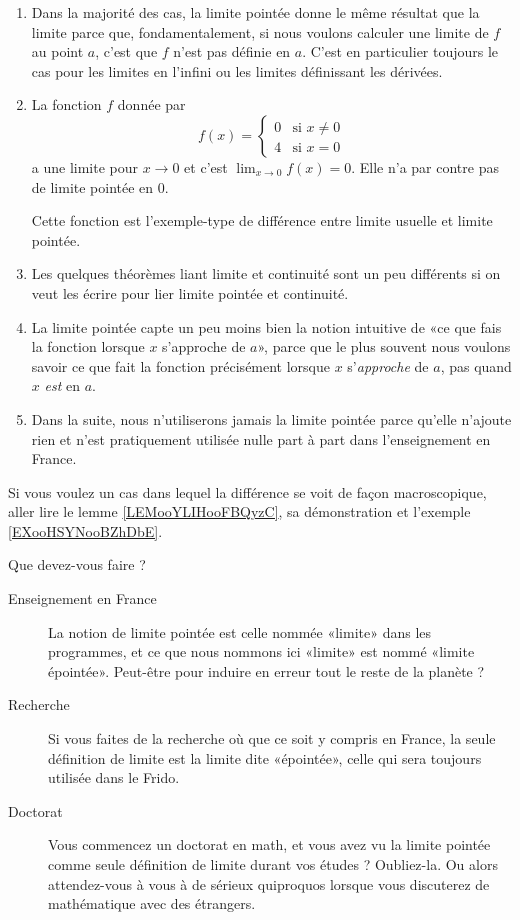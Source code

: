 \begin{enumerate}
    \item
        Dans la majorité des cas, la limite pointée donne le même résultat que la limite parce que, fondamentalement, si nous voulons calculer une limite de \( f\) au point \( a\), c'est que \( f\) n'est pas définie en \( a\). C'est en particulier toujours le cas pour les limites en l'infini ou les limites définissant les dérivées.
    \item
        La fonction \( f\) donnée par
        \begin{equation}
            f(x)=\begin{cases}
                0    &   \text{si } x\neq 0\\
                4    &    \text{si }x=0
            \end{cases}
        \end{equation}
        a une limite pour \( x\to 0\) et c'est \( \lim_{x\to 0} f(x)=0\). Elle n'a par contre pas de limite pointée en \( 0\).

        Cette fonction est l'exemple-type de différence entre limite usuelle et limite pointée.
    \item
        Les quelques théorèmes liant limite et continuité sont un peu différents si on veut les écrire pour lier limite pointée et continuité.
    \item
        La limite pointée capte un peu moins bien la notion intuitive de «ce que fais la fonction lorsque \( x\) s'approche de \( a\)», parce que le plus souvent nous voulons savoir ce que fait la fonction précisément lorsque \( x\) s'\emph{approche} de \( a\), pas quand \( x\) \emph{est} en \( a\).
    \item
        Dans la suite, nous n'utiliserons jamais la limite pointée parce qu'elle n'ajoute rien et n'est pratiquement utilisée nulle part à part dans l'enseignement en France.
\end{enumerate}

Si vous voulez un cas dans lequel la différence se voit de façon macroscopique, aller lire le lemme \ref{LEMooYLIHooFBQyzC}, sa démonstration et l'exemple \ref{EXooHSYNooBZhDbE}.

Que devez-vous faire ?
\begin{description}
    \item[Enseignement en France] La notion de limite pointée est celle nommée «limite» dans les programmes, et ce que nous nommons ici «limite» est nommé «limite épointée». Peut-être pour induire en erreur tout le reste de la planète ?
    \item[Recherche] Si vous faites de la recherche où que ce soit y compris en France, la seule définition de limite est la limite dite «épointée», celle qui sera toujours utilisée dans le Frido.
    \item[Doctorat] Vous commencez un doctorat en math, et vous avez vu la limite pointée comme seule définition de limite durant vos études ? Oubliez-la. Ou alors attendez-vous à vous à de sérieux quiproquos lorsque vous discuterez de mathématique avec des étrangers.
\end{description}

